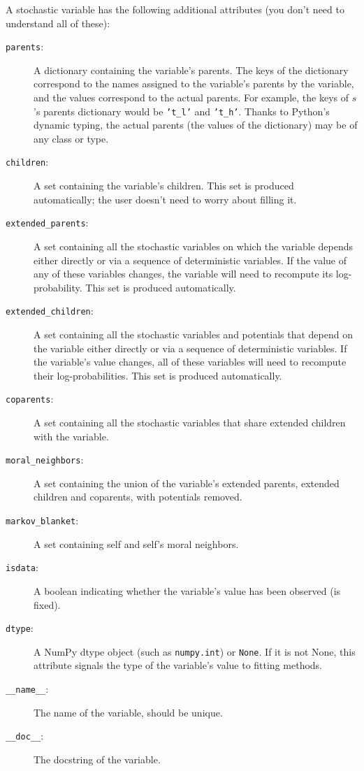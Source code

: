 A stochastic variable has the following additional attributes (you don't need to understand all of these):
\begin{description}
    \item[\texttt{parents}:] A dictionary containing the variable's parents. The keys of the dictionary correspond to the names assigned to the variable's parents by the variable, and the values correspond to the actual parents. For example, the keys of $s$'s parents dictionary would be \texttt{'t_l'} and \texttt{'t_h'}. Thanks to Python's dynamic typing, the actual parents (the values of the dictionary) may be of any class or type.
    \item[\texttt{children}:] A set containing the variable's children. This set is produced automatically; the user doesn't need to worry about filling it.
    \item[\texttt{extended_parents}:] A set containing all the stochastic variables on which the variable depends either directly or via a sequence of deterministic variables. If the value of any of these variables changes, the variable will need to recompute its log-probability. This set is produced automatically.
    \item[\texttt{extended_children}:] A set containing all the stochastic variables and potentials that depend on the variable either directly or via a sequence of deterministic variables. If the variable's value changes, all of these variables will need to recompute their log-probabilities. This set is produced automatically.
    \item[\texttt{coparents}:] A set containing all the stochastic variables that share extended children with the variable.
    \item[\texttt{moral_neighbors}:] A set containing the union of the variable's extended parents, extended children and coparents, with potentials removed.
    \item[\texttt{markov_blanket}:] A set containing self and self's moral neighbors.
    \item[\texttt{isdata}:] A boolean indicating whether the variable's value has been observed (is fixed).
    \item[\texttt{dtype}:] A NumPy dtype object (such as \texttt{numpy.int}) or \texttt{None}. If it is not None, this attribute signals the type of the variable's value to fitting methods.
    \item[\texttt{__name__}:] The name of the variable, should be unique.
    \item[\texttt{__doc__}:] The docstring of the variable.
\end{description}

